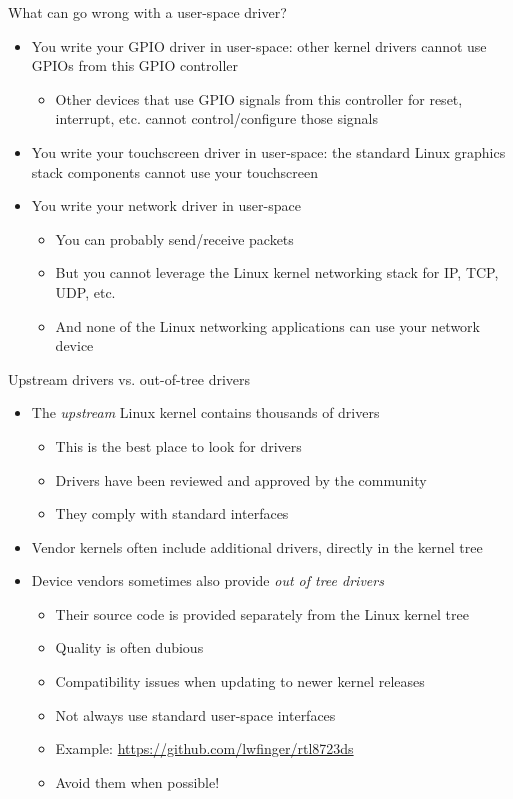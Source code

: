 \begin{frame}{What can go wrong with a user-space driver?}
  \begin{itemize}
  \item You write your GPIO driver in user-space: other kernel drivers
    cannot use GPIOs from this GPIO controller
    \begin{itemize}
    \item Other devices that use GPIO signals from this controller for reset, interrupt, etc. cannot control/configure those signals
    \end{itemize}
  \item You write your touchscreen driver in user-space: the standard
    Linux graphics stack components cannot use your touchscreen
  \item You write your network driver in user-space
    \begin{itemize}
    \item You can probably send/receive packets
    \item But you cannot leverage the Linux kernel networking stack
      for IP, TCP, UDP, etc.
    \item And none of the Linux networking applications can use your
      network device
    \end{itemize}
  \end{itemize}
\end{frame}

\begin{frame}{Upstream drivers vs. out-of-tree drivers}
  \begin{itemize}
  \item The {\em upstream} Linux kernel contains thousands of drivers
    \begin{itemize}
    \item This is the best place to look for drivers
    \item Drivers have been reviewed and approved by the community
    \item They comply with standard interfaces
    \end{itemize}
  \item Vendor kernels often include additional drivers, directly in
    the kernel tree
  \item Device vendors sometimes also provide {\em out of tree
      drivers}
    \begin{itemize}
    \item Their source code is provided separately from the Linux
      kernel tree
    \item Quality is often dubious
    \item Compatibility issues when updating to newer kernel releases
    \item Not always use standard user-space interfaces
    \item Example: \url{https://github.com/lwfinger/rtl8723ds}
    \item Avoid them when possible!
    \end{itemize}
  \end{itemize}
\end{frame}

